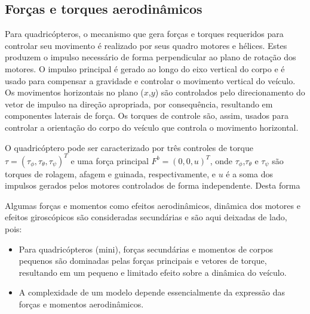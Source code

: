 \documentclass[a4paper, 12pt]{article}
\begin{document}
\subsection{Forças e torques aerodinâmicos}

Para quadricópteros, o mecanismo que gera forças e torques requeridos para controlar seu movimento é realizado por seus quadro motores e hélices. Estes produzem o impulso necessário de forma perpendicular ao plano de rotação dos motores. O impulso principal é gerado ao longo do eixo vertical do corpo e é usado para compensar a gravidade e controlar o movimento vertical do veículo. Os movimentos horizontais no plano ($x$,$y$) são controlados pelo direcionamento do vetor de impulso na direção apropriada, por consequência, resultando em componentes laterais de força. Os torques de controle são, assim, usados para controlar a orientação do corpo do veículo que controla o movimento horizontal.

O quadricóptero pode ser caracterizado por três controles de torque $\tau = (\tau_\phi,\tau_\theta,\tau_\psi)^T$ e uma força principal $F^b = (0,0,u)^T$, onde $\tau_\phi$,$\tau_\theta$ e $\tau_\psi$ são torques de rolagem, afagem e guinada, respectivamente, e $u$ é a soma dos impulsos gerados pelos motores controlados de forma independente. 
Desta forma



Algumas forças e momentos como efeitos aerodinâmicos, dinâmica dos motores e efeitos giroscópicos são consideradas secundárias e são aqui deixadas de lado, pois:

\begin{itemize}
\item	Para quadricópteros (mini), forças secundárias e momentos de corpos pequenos são dominadas pelas forças principais e vetores de torque, resultando em um pequeno e limitado efeito sobre a dinâmica do veículo.
\item A complexidade de um modelo depende essencialmente da expressão das forças e momentos aerodinâmicos.
\end{itemize}

\newpage


 

\newpage
\end{document}

